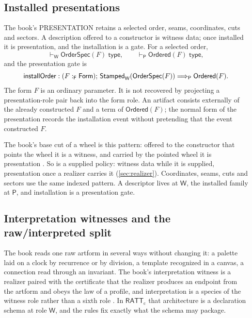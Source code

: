 \documentclass[11pt]{article}
\numberwithin{equation}{section}
\theoremstyle{definition}
\theoremstyle{plain}
\theoremstyle{remark}
\newcommand{\RATT}{\mathsf{RATT}_{\mathrm c}}
\renewcommand{\Form}{\AFForm}
\newcommand{\Stamped}{\mathsf{Stamped}}
\newcommand{\Frm}{\mathsf F}
\newcommand{\Prs}{\mathsf P}
\newcommand{\Wit}{\mathsf W}
\newcommand{\PRES}{\textsf{PRESENTATION}}
\newcommand{\jtype}{\mathrel{\mathsf{type}}}
\begin{document}
\subsection{Installed presentations}\label{sec:installed-presentations}
\label{sec:installed-structure}

The book's \PRES{} retains a selected order, seams, coordinates, cuts and
sectors.  A description offered to a constructor is witness data; once
installed it is presentation, and the installation is a gate.  For a selected
order,
\[
 \vdash_{\Wit}\mathsf{OrderSpec}(F)\;\jtype,
 \qquad
 \vdash_{\Prs}\mathsf{Ordered}(F)\;\jtype,
\]
and the presentation gate is
\[
 \mathsf{installOrder}:
 (F:_{\Frm}\Form);\,
 \Stamped_\Wit(\mathsf{OrderSpec}(F))
 \Longrightarrow_{\Prs}\mathsf{Ordered}(F).
\]
The form \(F\) is an ordinary parameter.  It is not recovered by projecting a
presentation-role pair back into the form role.  An artifact consists
externally of the already constructed \(F\) and a term of
\(\mathsf{Ordered}(F)\); the normal form of the presentation records the
installation event without pretending that the event constructed \(F\).

The book's base cut of a wheel is this pattern: offered to the constructor
that points the wheel it is a witness, and carried by the pointed wheel it is
presentation \cite[\S1.9]{Book}.  So is a supplied policy: witness data while
it is supplied, presentation once a realizer carries it (\cref{sec:realizer}).
Coordinates, seams, cuts and sectors use the same indexed pattern.  A
descriptor lives at \(\Wit\), the installed family at \(\Prs\), and
installation is a presentation gate.

\subsection{Interpretation witnesses and the raw/interpreted split}\label{sec:interpretation}
\label{sec:interpretation-witnesses}

The book reads one raw artform in several ways without changing
it: a palette laid on a clock by recurrence or by division, a template
recognized in a canvas, a connection read through an invariant.  The book's
interpretation witness is a realizer paired with the certificate that the
realizer produces an endpoint from the artform and obeys the law of a
profile, and interpretation is a species of the witness role rather than a
sixth role \cite[Def.~1.9]{Book}.
In \(\RATT\) that architecture is a declaration schema at role \(\Wit\), and
the rules fix exactly what the schema may package.
\end{document}
